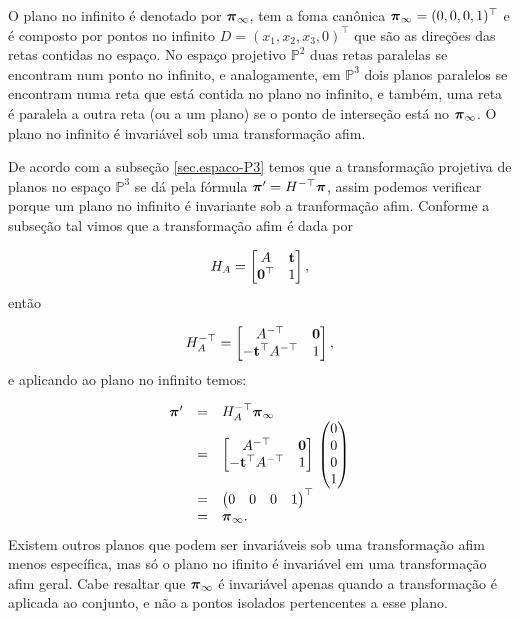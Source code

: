 O plano no infinito é denotado por $\boldsymbol{\pi}_\infty$, tem a foma canônica $\boldsymbol{\pi}_\infty=(0,0,0,1)^\top$ e é composto por pontos no infinito $D=(x_1,x_2,x_3,0)^\top$ que são as direções das retas contidas no espaço. No espaço projetivo $\mathbb{P}^2$ duas retas paralelas se encontram num ponto no infinito, e analogamente, em  $\mathbb{P}^3$ dois planos paralelos se encontram numa reta que está contida no plano no infinito, e também, uma reta é paralela a outra reta (ou a um plano) se o ponto de interseção está no $\boldsymbol{\pi}_\infty$. O plano no infinito é invariável sob uma transformação afim.

De acordo com a subseção \ref{sec.espaco-P3} temos que a transformação projetiva de planos no espaço  $\mathbb{P}^3$ se dá pela fórmula $\boldsymbol{\pi}'=H^{-\top}\boldsymbol{\pi}$, assim podemos verificar porque um plano no infinito é invariante sob a tranformação afim. Conforme a subseção tal vimos que a transformação afim é dada por 

\begin{equation*}
H_A=
\begin{bmatrix}
A&{\bf t}\\
{\bf 0}^\top&1
\end{bmatrix},
\end{equation*}
então

\begin{equation*}
H_A^{-\top}=
\begin{bmatrix}
A^{-\top}&{\bf 0}\\
-{\bf t}^\top A^{-\top}&1
\end{bmatrix},
\end{equation*}
e aplicando ao plano no infinito temos:

\begin{equation*}
\begin{array}{rcl}
\boldsymbol{\pi}'&=&H_A^{-\top}\boldsymbol{\pi}_\infty\\
&=&
\begin{bmatrix}
A^{-\top}&{\bf 0}\\
-{\bf t}^\top A^{-\top}&1
\end{bmatrix}\,
\begin{pmatrix}
0\\
0\\
0\\
1
\end{pmatrix}\\
&=&
\begin{pmatrix}
0&0&0&1
\end{pmatrix}^\top\\
&=&
\boldsymbol{\pi}_\infty.
\end{array}
\end{equation*}
Existem outros planos que podem ser invariáveis sob uma transformação afim menos específica, mas só o plano no ifinito é invariável em uma transformação afim geral. Cabe resaltar que $\boldsymbol{\pi}_\infty$ é invariável apenas quando a transformação é aplicada ao conjunto, e não a pontos isolados pertencentes a esse plano.


